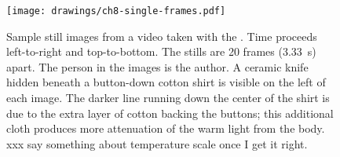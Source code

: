 \begin{figure}[th]
\centering
\texttt{[image: drawings/ch8-single-frames.pdf]}
\caption{
Sample still images from a video taken with the \Imager.
Time proceeds left-to-right and top-to-bottom.
The stills are 20 frames (\SI{3.33}{\s}) apart.
The person in the images is the author.
A ceramic knife hidden beneath a button-down cotton shirt is visible on the left of each image.
The darker line running down the center of the shirt is due to the extra layer of cotton backing the buttons; this additional cloth produces more attenuation of the warm light from the body.
xxx say something about temperature scale once I get it right.}
\label{fig:ch8-single-frames}
\end{figure}

